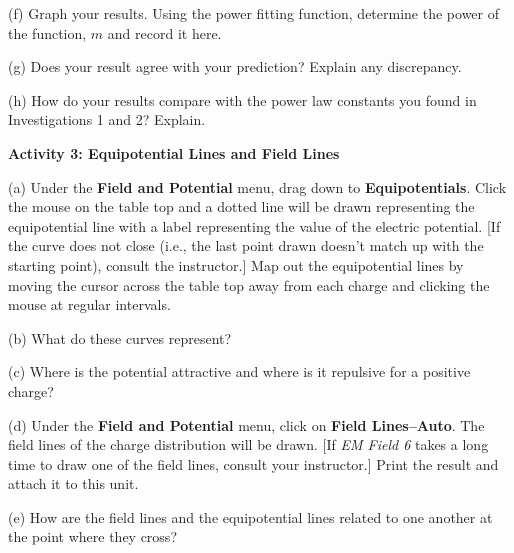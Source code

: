 (f) Graph your results. Using the power fitting
function, determine the power of the function, $m$ and record it here.
\vspace{15mm}

(g) Does your result agree with your prediction? Explain any discrepancy.\vspace{15mm}

(h) How do your results compare with the power law constants you found
in Investigations 1 and 2? Explain.\vspace{15mm}


\textbf{Activity 3: Equipotential Lines and Field Lines}


(a) Under the \textbf{Field and Potential} menu, drag down to \textbf{Equipotentials}.
Click the mouse on the table top and a
dotted line will be drawn representing the equipotential line with a label
representing the value of the electric potential. {[}If
the curve does not close (i.e., the last point drawn doesn't match
up with the starting point), consult the instructor.{]} Map out the
equipotential lines by moving the cursor across the table top away
from each charge and clicking the mouse at regular intervals.

(b) What do these curves represent?\vspace{15mm}

(c) Where is the potential attractive and where is it repulsive for a
positive charge?\vspace{15mm}

(d) Under the \textbf{Field and Potential} menu, click on \textbf{Field Lines--Auto}.
The field lines of the charge distribution will be drawn. {[}If \textit{EM Field 6}
takes a long time to draw one of the field lines, consult your instructor.{]}
Print the result and attach it to this unit.
\vspace{30mm}
 
(e) How are the field lines and the equipotential lines related to one
another at the point where they cross?\vspace{15mm}


